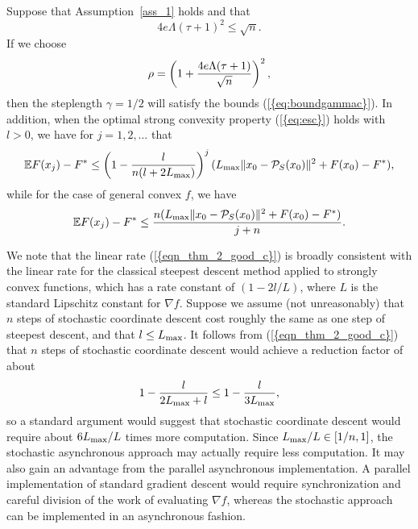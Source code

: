 \documentclass{siamltex}
\newcounter{ass_counter}
\begin{document}
\begin{corollary} \label{co:thm_2}
Suppose that Assumption~\ref{ass_1} holds and that
\begin{equation} \label{eq:boundtauc}
4e\Lambda(\tau + 1)^2 \leq \sqrt{n}.
\end{equation}
If we choose
\begin{equation} \label{eq:choicerhoc}
\rho=\left(1+{4e\Lambda(\tau+{1}) \over  \sqrt{n}}\right)^2,
\end{equation}
then the steplength $\gamma=1/2$ will satisfy the bounds
{(\ref{{eq:boundgammac}})}. In addition, when the optimal strong convexity
property {(\ref{{eq:esc}})} holds with $l>0$, we have for $j=1,2,\dotsc$
that
\begin{equation}
 \label{eqn_thm_2_good_c}
{\mathbb{E}} F(x_j)-F^*
 \le \left( 1-\frac{l}{n(l+2{L_{\mbox{\rm\scriptsize max}}})} \right)^j ({L_{\mbox{\rm\scriptsize max}}} \|x_0-{\mathcal{P}_{S}}(x_0)\|^2 + F(x_0)-F^*),
\end{equation}
while for the case of general convex $f$, we have
\begin{equation} \label{eqn_thm_3_good_c}
{\mathbb{E}} F(x_j)-F^* \le  \frac{n({L_{\mbox{\rm\scriptsize max}}} \|x_0-{\mathcal{P}_{S}}(x_0)\|^2 + F(x_0)-F^*)}{j+n}.
\end{equation}
\end{corollary}

We note that the linear rate {(\ref{{eqn_thm_2_good_c}})} is broadly
consistent with the linear rate for the classical steepest descent
method applied to strongly convex functions, which has a rate constant
of $(1-2l/L)$, where $L$ is the standard Lipschitz constant for
$\nabla f$. Suppose we assume (not unreasonably) that $n$ steps of
stochastic coordinate descent cost roughly the same as one step of
steepest descent, and that $l \le {L_{\mbox{\rm\scriptsize max}}}$. It follows from
{(\ref{{eqn_thm_2_good_c}})} that $n$ steps of stochastic coordinate
descent would achieve a reduction factor of about
\[
1-\frac{l}{2 {L_{\mbox{\rm\scriptsize max}}} + l} \leq 1-\frac{l}{3{L_{\mbox{\rm\scriptsize max}}}}, 
\]
{} so a standard argument would
suggest that stochastic coordinate descent would require about $6
{L_{\mbox{\rm\scriptsize max}}}/L$ times more computation. Since ${L_{\mbox{\rm\scriptsize max}}}/L \in [1/n,1]$, the
stochastic asynchronous approach may actually require less
computation.  It may also gain an advantage from the parallel
asynchronous implementation. A parallel implementation of standard
gradient descent would require synchronization and careful division of
the work of evaluating $\nabla f$, whereas the stochastic approach can
be implemented in an asynchronous fashion.
\end{document}

